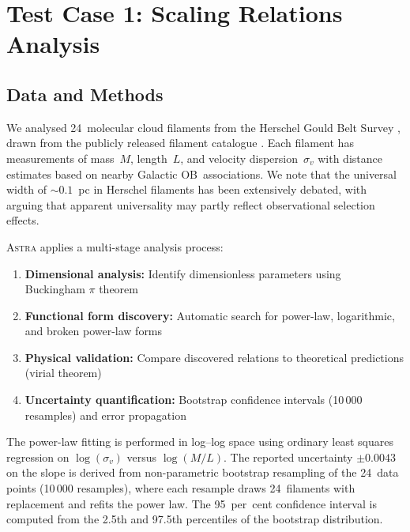 \documentclass[fleqn,usenatbib]{mnras}
\newcommand{\astra}{\textsc{Astra}\xspace}
\begin{document}
\section{Test Case 1: Scaling Relations Analysis}
\label{sec:tc1}

\subsection{Data and Methods}
\label{sec:tc1:data}

We analysed 24~molecular cloud filaments from the Herschel Gould Belt Survey \citep[HGBS;][]{Andre2010}, drawn from the publicly released filament catalogue \citep{Arzoumanian2019}.
Each filament has measurements of mass~$M$, length~$L$, and velocity dispersion~$\sigma_v$ with distance estimates based on nearby Galactic OB~associations.
We note that the universal width of $\sim\!0.1$~pc in Herschel filaments has been extensively debated, with \citet{Panopoulou2022} arguing that apparent universality may partly reflect observational selection effects.

\astra applies a multi-stage analysis process:
\begin{enumerate}
  \item[(i)] \textbf{Dimensional analysis:} Identify dimensionless parameters using Buckingham $\pi$ theorem
  \item[(ii)] \textbf{Functional form discovery:} Automatic search for power-law, logarithmic, and broken power-law forms
  \item[(iii)] \textbf{Physical validation:} Compare discovered relations to theoretical predictions (virial theorem)
  \item[(iv)] \textbf{Uncertainty quantification:} Bootstrap confidence intervals (10\,000 resamples) and error propagation
\end{enumerate}

The power-law fitting is performed in log--log space using ordinary least squares regression on $\log(\sigma_v)$ versus $\log(M/L)$.
The reported uncertainty $\pm 0.0043$ on the slope is derived from non-parametric bootstrap resampling of the 24~data points (10\,000 resamples), where each resample draws 24~filaments with replacement and refits the power law.
The 95~per~cent confidence interval is computed from the 2.5th and 97.5th percentiles of the bootstrap distribution.
\end{document}
